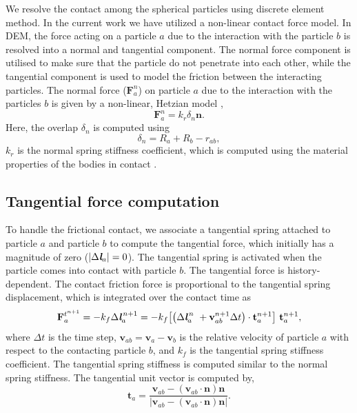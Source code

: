 \documentclass[preprint,12pt]{elsarticle}
\newcommand{\teng}[1]{\ensuremath{\boldsymbol{#1}}}
\newcommand{\ten}[1]{\ensuremath{\mathbf{#1}}}
\begin{document}
We resolve the contact among the spherical particles using discrete element
method. In the current work we have utilized a non-linear contact force
model. In DEM, the force acting on a particle $a$ due to the interaction with
the particle $b$ is resolved into a normal and tangential component. The
normal force component is utilised to make sure that the particle do not
penetrate into each other, while the tangential component is used to model the
friction between the interacting particles.  The normal force
($\teng{F}_a^{n}$) on particle $a$ due to the interaction with the particles
$b$ is given by a non-linear, Hetzian model \citet{brilliantov1996model},
\begin{equation}
  \label{eq:contact-algorithm-normal}
  \ten{F}_a^n = k_r \delta_{n} \ten{n}.
\end{equation}
Here, the overlap $\delta_{n}$ is computed using
\begin{equation}
  \label{eq:cf-overlap}
  \delta_{n} = R_{a} + R_{b} - r_{ab},
\end{equation}
$k_r$ is the normal spring stiffness coefficient, which is computed using the
material properties of the bodies in contact \cite{golshan2023lethe}.


\subsection{Tangential force computation}
\label{sec:tangential-force-computation}
To handle the frictional contact, we associate a tangential spring attached to
particle $a$ and particle $b$ to compute the tangential force, which initially has
a magnitude of zero ($|\Delta \textit{\textbf{l}}_a|=0$). The tangential spring
is activated when the particle comes into contact with particle $b$. The
tangential force is history-dependent. The contact friction force is
proportional to the tangential spring displacement, which is integrated over
the contact time as
\begin{equation}
  \label{eq:tangential-force}
  \ten{F}_{a}^{t^{n+1}} =
  -k_f \Delta \textit{\textbf{l}}_a^{\,n + 1} =
  -k_f \big[\big(\Delta {\textit{\textbf{l}}}_a^{\,n} \
  + \ten{v}_{ab}^{n + 1} \Delta t\big) \cdot \ten{t}_a^{n + 1} \big] \
  \ten{t}_a^{n + 1},
\end{equation}
where $\Delta t$ is the time step, $\ten{v}_{ab} = \ten{v}_{a} - \ten{v}_b$ is the
relative velocity of particle $a$ with respect to the contacting particle $b$,
and $k_f$ is the tangential spring stiffness coefficient. The tangential
spring stiffness is computed similar to the normal spring
stiffness\cite{golshan2023lethe}.  The tangential unit vector is computed by,
\begin{equation}
  \label{eq:tangential-vect}
  \ten{t}_a = \frac{\ten{v}_{ab} - (\ten{v}_{ab} \cdot \ten{n}) \ten{n}}{|\ten{v}_{ab} - (\ten{v}_{ab} \cdot \ten{n}) \ten{n}|}.
\end{equation}
\end{document}
